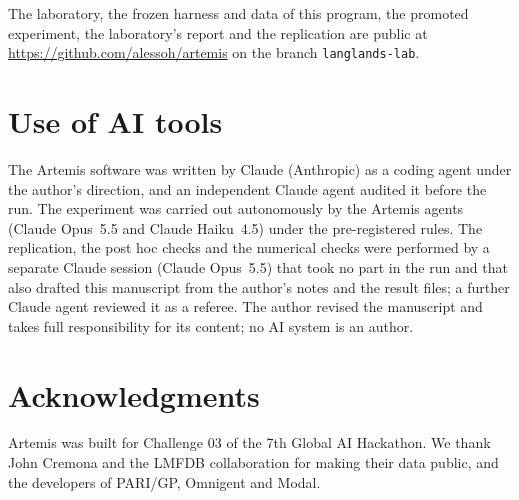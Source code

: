 \documentclass[11pt]{amsart}
\numberwithin{equation}{section}
\begin{document}
The laboratory, the frozen harness and data of this program, the promoted experiment, the laboratory's report and the replication are public at \url{https://github.com/alessoh/artemis} on the branch \texttt{langlands-lab}.

\section*{Use of AI tools}
The Artemis software was written by Claude (Anthropic) as a coding agent under the author's direction, and an independent Claude agent audited it before the run. The experiment was carried out autonomously by the Artemis agents (Claude Opus~5.5 and Claude Haiku~4.5) under the pre-registered rules. The replication, the post hoc checks and the numerical checks were performed by a separate Claude session (Claude Opus~5.5) that took no part in the run and that also drafted this manuscript from the author's notes and the result files; a further Claude agent reviewed it as a referee. The author revised the manuscript and takes full responsibility for its content; no AI system is an author.

\section*{Acknowledgments}
Artemis was built for Challenge 03 of the 7th Global AI Hackathon. We thank John Cremona and the LMFDB collaboration for making their data public, and the developers of PARI/GP, Omnigent and Modal.
\end{document}
